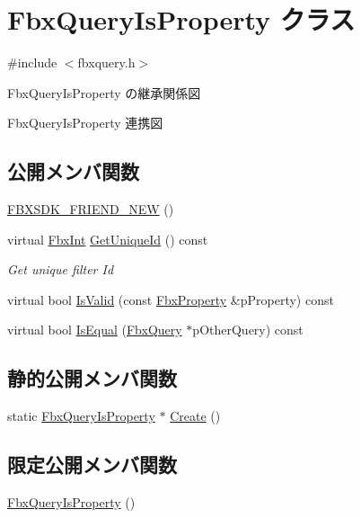 \hypertarget{class_fbx_query_is_property}{}\section{Fbx\+Query\+Is\+Property クラス}
\label{class_fbx_query_is_property}


{\ttfamily \#include $<$fbxquery.\+h$>$}



Fbx\+Query\+Is\+Property の継承関係図


Fbx\+Query\+Is\+Property 連携図
\subsection*{公開メンバ関数}
\begin{DoxyCompactItemize}
\item 
\hyperlink{class_fbx_query_is_property_af871937df7d2a293b46aa2e0fa7a481a}{F\+B\+X\+S\+D\+K\+\_\+\+F\+R\+I\+E\+N\+D\+\_\+\+N\+EW} ()
\item 
virtual \hyperlink{fbxtypes_8h_a088fa96de3b0b3ea69f0f6afef525dfb}{Fbx\+Int} \hyperlink{class_fbx_query_is_property_a390fb64587424e7d16cb4966566aee80}{Get\+Unique\+Id} () const
\begin{DoxyCompactList}\small\item\em Get unique filter Id \end{DoxyCompactList}\item 
virtual bool \hyperlink{class_fbx_query_is_property_a6f9680d513428cba6321203c9b3da71e}{Is\+Valid} (const \hyperlink{class_fbx_property}{Fbx\+Property} \&p\+Property) const
\item 
virtual bool \hyperlink{class_fbx_query_is_property_ace0b3dd62cc2614acc88ad892849416b}{Is\+Equal} (\hyperlink{class_fbx_query}{Fbx\+Query} $\ast$p\+Other\+Query) const
\end{DoxyCompactItemize}
\subsection*{静的公開メンバ関数}
\begin{DoxyCompactItemize}
\item 
static \hyperlink{class_fbx_query_is_property}{Fbx\+Query\+Is\+Property} $\ast$ \hyperlink{class_fbx_query_is_property_a9f9b91b8ea513a71c28d4e66654fb47f}{Create} ()
\end{DoxyCompactItemize}
\subsection*{限定公開メンバ関数}
\begin{DoxyCompactItemize}
\item 
\hyperlink{class_fbx_query_is_property_a7be21bf324d9b47b76ec34af5fc95d86}{Fbx\+Query\+Is\+Property} ()
\end{DoxyCompactItemize}


